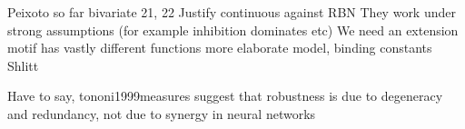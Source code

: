 \documentclass[../main.tex]{subfiles}
\begin{document}
Peixoto so far
bivariate 21, 22
Justify continuous against RBN
They work under strong assumptions (for example inhibition dominates etc) \cite{}
We need an extension
motif has vastly different functions \cite{ingram2006network}
more elaborate model, binding constants	\cite{ingram2006network}
Shlitt

Have to say, tononi1999measures suggest that robustness is due to degeneracy and redundancy, not due to synergy in neural networks
\end{document}
